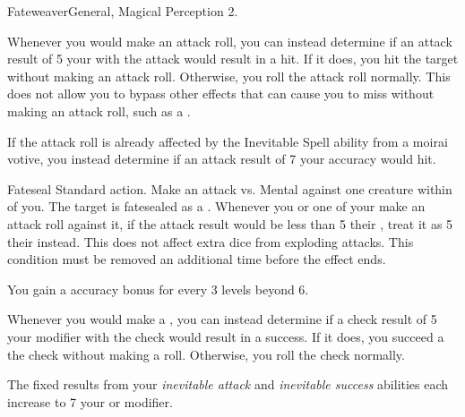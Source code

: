   \begin{feat}{Fateweaver}{General, Magical}
    \featpre Perception 2.

     Whenever you would make an attack roll, you can instead determine if an attack result of 5 \add your  with the attack would result in a hit.
    If it does, you hit the target without making an attack roll.
    Otherwise, you roll the attack roll normally.
    This does not allow you to bypass other effects that can cause you to miss without making an attack roll, such as a .

    If the attack roll is already affected by the Inevitable Spell ability from a moirai votive, you instead determine if an attack result of 7 \add your accuracy would hit.

    \begin{magicalactiveability}{Fateseal}
      \abilityusagetime Standard action.
      \rankline
      Make an attack vs. Mental against one creature within \medrange of you.
      \hit The target is fatesealed as a .
      Whenever you or one of your  make an attack roll against it, if the attack result would be less than 5 \add their , treat it as 5 \add their  instead.
      This does not affect extra dice from exploding attacks.
      \crit This condition must be removed an additional time before the effect ends.

      \rankline
      You gain a  accuracy bonus for every 3 levels beyond 6.
    \end{magicalactiveability}

     Whenever you would make a , you can instead determine if a check result of 5 \add your modifier with the check would result in a success.
    If it does, you succeed a the check without making a roll.
    Otherwise, you roll the check normally.

     The fixed results from your \textit{inevitable attack} and \textit{inevitable success} abilities each increase to 7 \add your  or modifier.
  \end{feat}

